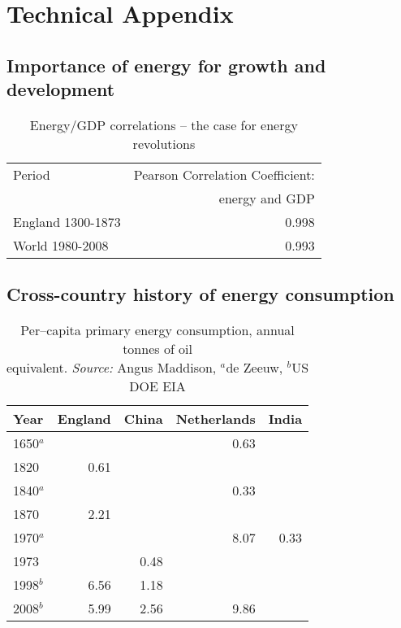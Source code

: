 \chapter{Technical Appendix} \label{sec:techAppendix}


\section{Importance of energy for growth and development}

\linespread{1.2}
\begin{table}[h!]
\begin{center}
\begin{tabular}{lr}
Period&Pearson Correlation Coefficient: \\
&energy and GDP\\
\hline \hline
England 1300-1873&0.998\\
World 1980-2008& 0.993\\
\hline
\end{tabular}

\end{center}
\caption{Energy/GDP correlations -- the case for energy revolutions}\label{tbl:cor}

\end{table}
\linespread{1.9}
\section{Cross-country history of energy consumption}

\linespread{1.0}
\begin{table}[h!]
	\centering
	\begin{tabular}{lrrrr}
	Year&England&China&Netherlands&India\\
	\hline \hline
	1650$^a$&&&0.63&  \\
	1820&0.61&&&\\
	1840$^a$ &&&0.33& \\
	1870&2.21&\\
	1970$^a$ &&&8.07&0.33 \\
	1973&&0.48&&\\
	1998$^b$&6.56&1.18\\
	2008$^b$&5.99&2.56&9.86&  \\
	\hline
	\end{tabular}
	\caption{Per--capita primary energy consumption, annual tonnes of oil \\equivalent. \textit{Source:} Angus Maddison, $^a$de Zeeuw, $^b$US DOE EIA}
	\label{tab:capitaEnergy}

	\end{table}
\linespread{1.9}
\newpage

